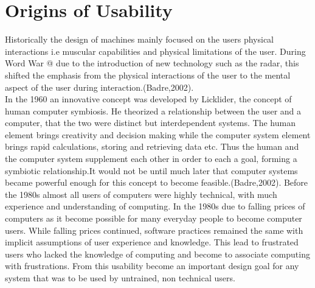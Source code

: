 \documentclass[a4paper,oneside,11pt]{report}
\makeatletter
\newcommand*{\rom}[1]{\expandafter\@slowromancap\romannumeral #1@}
\makeatother
\begin{document}
\section{Origins of Usability}
Historically the design of machines mainly focused on the users physical interactions i.e muscular capabilities and physical limitations of the user. During Word War \rom{2} due to the introduction of new technology such as the radar, this shifted the emphasis from the physical interactions of the user to the mental aspect of the user during interaction.(Badre,2002). \\
In the 1960 an innovative concept was developed by Licklider, the concept of human computer symbiosis. He theorized a relationship between the user and a computer, that the two were distinct but interdependent systems. The human element brings creativity and decision making while the computer system element brings rapid calculations, storing and retrieving data etc. Thus the human and the computer system supplement each other in order to each a goal, forming a symbiotic relationship.It would not be until much later that computer systems became powerful enough for this concept to become feasible.(Badre,2002).
Before the 1980s almost all users of computers were highly technical, with much experience and understanding of computing. In the 1980s due to falling prices of computers as it become possible for many everyday people to become computer users. While falling prices continued, software practices remained the same with implicit assumptions of user experience and knowledge. This lead to frustrated users who lacked the knowledge of computing and become to associate computing with frustrations. From this usability become an important design goal for any system that was to be used by untrained, non technical users.\autocite{gilbert2013}
\end{document}
